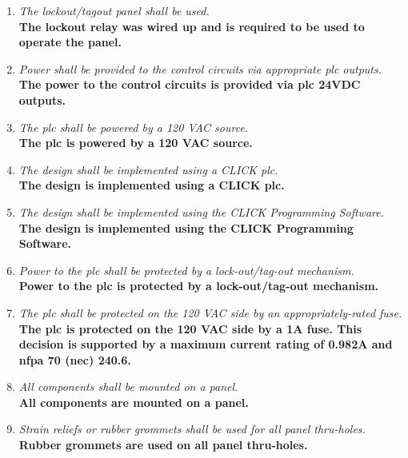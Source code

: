 \begin{enumerate}
  \item \emph{ The lockout/tagout panel shall be used.}\\
    \textbf{The lockout relay was wired up and is required to be used
    to operate the panel.}

  \item \emph{ Power shall be provided to the control circuits via
    appropriate \gls{plc} outputs.}\\
    \textbf{The power to the control circuits is provided via \gls{plc}
    24VDC outputs.}

  \item \emph{ The \gls{plc} shall be powered by a 120 VAC source.}\\
    \textbf{The \gls{plc} is powered by a 120 VAC source.}

  \item \emph{ The design shall be implemented using a CLICK \gls{plc}.}\\
    \textbf{The design is implemented using a CLICK \gls{plc}.}

  \item \emph{ The design shall be implemented using the CLICK
    Programming Software.}\\
    \textbf{The design is implemented using the CLICK Programming Software.}

  \item \emph{ Power to the \gls{plc} shall be protected by a
    lock-out/tag-out mechanism.}\\
    \textbf{Power to the \gls{plc} is protected by a lock-out/tag-out
    mechanism.}

  \item \emph{ The \gls{plc} shall be protected on the 120 VAC side by an
    appropriately-rated fuse.}\\
    \textbf{
      The \gls{plc} is protected on the 120 VAC side by a 1A fuse. This
      decision is supported by
      a maximum current rating of 0.982A and \gls{nfpa} 70 (\gls{nec}) 240.6.
    }

  \item \emph{ All components shall be mounted on a panel.}\\
    \textbf{All components are mounted on a panel.}

  \item \emph{ Strain reliefs or rubber grommets shall be used for
    all panel thru-holes.}\\
    \textbf{Rubber grommets are used on all panel thru-holes.}


\end{enumerate}
